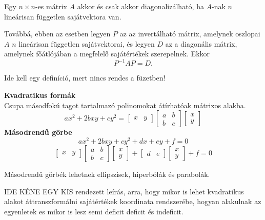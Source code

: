 \documentclass[a4paper, 12pt]{scrartcl}
\begin{document}
\begin{theorem}
  Egy \( n \times n \)-es mátrix \( A \) akkor és csak akkor diagonalizálható, ha \( A \)-nak \( n \) lineárisan független sajátvektora van.

  Továbbá, ebben az esetben legyen \( P \) az az invertálható mátrix, amelynek oszlopai \( A \) \( n \) lineárisan független sajátvektorai, és legyen \( D \) az a diagonális mátrix, amelynek főátlójában a megfelelő sajátértékek szerepelnek. Ekkor
  \[
    P^{-1}AP = D.
  \]
\end{theorem}

\begin{definition}[Mátrixfüggvények]
  Ide kell egy definíció, mert nincs rendes a füzetben!
\end{definition}

\begin{blueBox}
  \textbf{Kvadratikus formák}\\
  Csupa másodfokú tagot tartalmazó polinomokat átírhatóak mátrixos alakba.
  \[
    ax^2 + 2bxy + cy^2 = \begin{bmatrix}
      x & y
    \end{bmatrix} \begin{bmatrix}
      a & b \\
      b & c
    \end{bmatrix} \begin{bmatrix}
      x \\
      y
    \end{bmatrix}
  \]
  \textbf{Másodrendű görbe}
  \[
    ax^2 + 2bxy + cy^2 + dx + ey + f = 0
  \]
  \[
    \begin{bmatrix}
      x & y
    \end{bmatrix} \begin{bmatrix}
      a & b \\
      b & c
    \end{bmatrix} \begin{bmatrix}
      x \\
      y
    \end{bmatrix} + \begin{bmatrix}
      d & e
    \end{bmatrix} \begin{bmatrix}
      x \\
      y
    \end{bmatrix} + f = 0
  \]

  Másodrendű görbék lehetnek ellipszisek, hiperbólák és parabolák.

  IDE KÉNE EGY KIS rendezett leírás, arra, hogy mikor is lehet kvadratikus alakot áttranszformálni sajátértékek koordinata rendszerébe, hogyan alakulnak az egyenletek es mikor is lesz semi deficit deficit és indeficit.
\end{blueBox}
\end{document}
